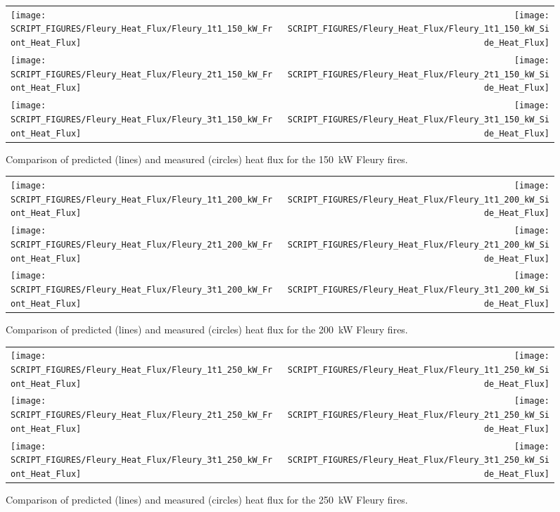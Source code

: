 \begin{figure}[p]
\begin{tabular*}{\textwidth}{l@{\extracolsep{\fill}}r}
\texttt{[image: SCRIPT\_FIGURES/Fleury\_Heat\_Flux/Fleury\_1t1\_150\_kW\_Front\_Heat\_Flux]} &
\texttt{[image: SCRIPT\_FIGURES/Fleury\_Heat\_Flux/Fleury\_1t1\_150\_kW\_Side\_Heat\_Flux]} \\
\texttt{[image: SCRIPT\_FIGURES/Fleury\_Heat\_Flux/Fleury\_2t1\_150\_kW\_Front\_Heat\_Flux]} &
\texttt{[image: SCRIPT\_FIGURES/Fleury\_Heat\_Flux/Fleury\_2t1\_150\_kW\_Side\_Heat\_Flux]} \\
\texttt{[image: SCRIPT\_FIGURES/Fleury\_Heat\_Flux/Fleury\_3t1\_150\_kW\_Front\_Heat\_Flux]} &
\texttt{[image: SCRIPT\_FIGURES/Fleury\_Heat\_Flux/Fleury\_3t1\_150\_kW\_Side\_Heat\_Flux]}
\end{tabular*}
\label{Fleury_Heat_Flux_150_kW}
\caption[Fleury Heat Flux, 150 kW fires.]
{Comparison of predicted (lines) and measured (circles) heat flux for the 150~kW Fleury fires.}
\end{figure}

\begin{figure}[p]
\begin{tabular*}{\textwidth}{l@{\extracolsep{\fill}}r}
\texttt{[image: SCRIPT\_FIGURES/Fleury\_Heat\_Flux/Fleury\_1t1\_200\_kW\_Front\_Heat\_Flux]} &
\texttt{[image: SCRIPT\_FIGURES/Fleury\_Heat\_Flux/Fleury\_1t1\_200\_kW\_Side\_Heat\_Flux]} \\
\texttt{[image: SCRIPT\_FIGURES/Fleury\_Heat\_Flux/Fleury\_2t1\_200\_kW\_Front\_Heat\_Flux]} &
\texttt{[image: SCRIPT\_FIGURES/Fleury\_Heat\_Flux/Fleury\_2t1\_200\_kW\_Side\_Heat\_Flux]} \\
\texttt{[image: SCRIPT\_FIGURES/Fleury\_Heat\_Flux/Fleury\_3t1\_200\_kW\_Front\_Heat\_Flux]} &
\texttt{[image: SCRIPT\_FIGURES/Fleury\_Heat\_Flux/Fleury\_3t1\_200\_kW\_Side\_Heat\_Flux]}
\end{tabular*}
\label{Fleury_Heat_Flux_200_kW}
\caption[Fleury Heat Flux, 200 kW fires.]
{Comparison of predicted (lines) and measured (circles) heat flux for the 200~kW Fleury fires.}
\end{figure}

\begin{figure}[p]
\begin{tabular*}{\textwidth}{l@{\extracolsep{\fill}}r}
\texttt{[image: SCRIPT\_FIGURES/Fleury\_Heat\_Flux/Fleury\_1t1\_250\_kW\_Front\_Heat\_Flux]} &
\texttt{[image: SCRIPT\_FIGURES/Fleury\_Heat\_Flux/Fleury\_1t1\_250\_kW\_Side\_Heat\_Flux]} \\
\texttt{[image: SCRIPT\_FIGURES/Fleury\_Heat\_Flux/Fleury\_2t1\_250\_kW\_Front\_Heat\_Flux]} &
\texttt{[image: SCRIPT\_FIGURES/Fleury\_Heat\_Flux/Fleury\_2t1\_250\_kW\_Side\_Heat\_Flux]} \\
\texttt{[image: SCRIPT\_FIGURES/Fleury\_Heat\_Flux/Fleury\_3t1\_250\_kW\_Front\_Heat\_Flux]} &
\texttt{[image: SCRIPT\_FIGURES/Fleury\_Heat\_Flux/Fleury\_3t1\_250\_kW\_Side\_Heat\_Flux]}
\end{tabular*}
\label{Fleury_Heat_Flux_250_kW}
\caption[Fleury Heat Flux, 250 kW fires.]
{Comparison of predicted (lines) and measured (circles) heat flux for the 250~kW Fleury fires.}
\end{figure}

